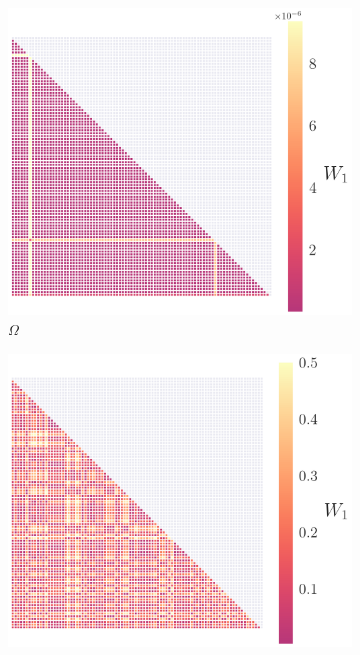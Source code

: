 \documentclass[fleqn,usenatbib,useAMS]{mnras}
\begin{document}
\begin{figure}

	\begin{subfigure}[b]{0.22\textwidth}
		\includegraphics[width=\textwidth]{images/WD_0}
		\caption{$\Omega$}
	\end{subfigure}
	\hfill
	\begin{subfigure}[b]{0.22\textwidth}
		\includegraphics[width=\textwidth]{images/WD_1}

\end{subfigure}
\end{figure}
\end{document}
